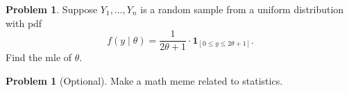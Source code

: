 \documentclass[10pt]{article}
\theoremstyle{definition}
\newtheorem{problem}[theorem]{Problem}
\newcommand{\1}[1]{\textbf{1}_{\left[#1\right]}} %
\begin{document}
\begin{problem}
  Suppose $Y_{1},\ldots,Y_{n}$ is a random sample from a uniform distribution
  with pdf
  \begin{equation*}
    f(y\mid \theta) = \frac{1}{2\theta+1}\cdot \mathbf{1}_{\left[ 0 \leq y \leq 2\theta+1\right]}.
  \end{equation*}
  Find the mle of $\theta$. 
\end{problem}

\begin{problem}[Optional]
  Make a math meme related to statistics.
\end{problem}
\end{document}
